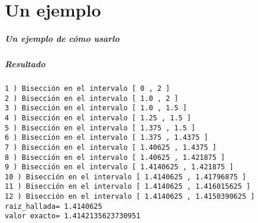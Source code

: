 \documentclass[11pt]{beamer}
\begin{document}
\part{Un ejemplo}

\frame{\partpage}


\begin{frame}

\frametitle{Un ejemplo de cómo usarlo}



\end{frame}

\begin{frame}[fragile]
\frametitle{Resultado}

\begin{verbatim}
1 ) Bisección en el intervalo [ 0 , 2 ]
2 ) Bisección en el intervalo [ 1.0 , 2 ]
3 ) Bisección en el intervalo [ 1.0 , 1.5 ]
4 ) Bisección en el intervalo [ 1.25 , 1.5 ]
5 ) Bisección en el intervalo [ 1.375 , 1.5 ]
6 ) Bisección en el intervalo [ 1.375 , 1.4375 ]
7 ) Bisección en el intervalo [ 1.40625 , 1.4375 ]
8 ) Bisección en el intervalo [ 1.40625 , 1.421875 ]
9 ) Bisección en el intervalo [ 1.4140625 , 1.421875 ]
10 ) Bisección en el intervalo [ 1.4140625 , 1.41796875 ]
11 ) Bisección en el intervalo [ 1.4140625 , 1.416015625 ]
12 ) Bisección en el intervalo [ 1.4140625 , 1.4150390625 ]
raiz_hallada= 1.4140625
valor exacto= 1.4142135623730951

\end{verbatim}
\end{frame}
\end{document}
